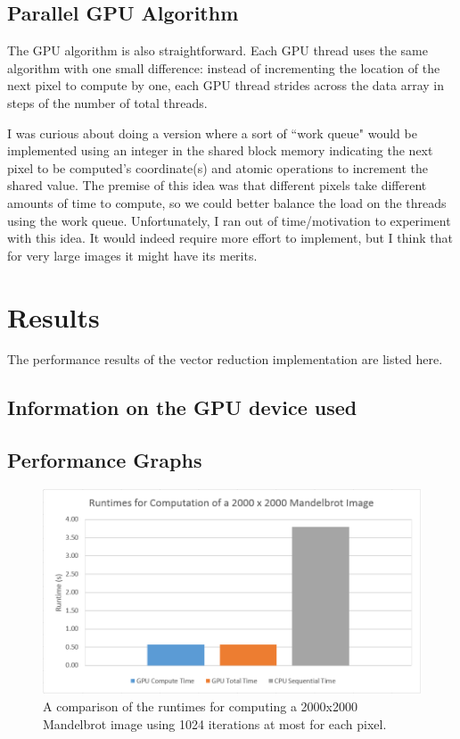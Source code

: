 \documentclass{article}
\begin{document}
\subsection{Parallel GPU Algorithm}
The GPU algorithm is also straightforward. Each GPU thread uses the same algorithm with one small difference: instead of incrementing the location of the next pixel to compute by one, each GPU thread strides across the data array in steps of the number of total threads.

I was curious about doing a version where a sort of ``work queue" would be implemented using an integer in the shared block memory indicating the next pixel to be computed's coordinate(s) and atomic operations to increment the shared value. The premise of this idea was that different pixels take different amounts of time to compute, so we could better balance the load on the threads using the work queue. Unfortunately, I ran out of time/motivation to experiment with this idea. It would indeed require more effort to implement, but I think that for very large images it might have its merits.

\newpage
\section{Results}
The performance results of the vector reduction implementation are listed here.

\subsection{Information on the GPU device used}

\newpage
\subsection{Performance Graphs}
  \begin{figure}[h!]
    \centering
    \includegraphics[width=.9\linewidth]{runtime}
    \caption{A comparison of the runtimes for computing a 2000x2000 Mandelbrot image using 1024 iterations at most for each pixel.}
    \label{fig:runtime}
  \end{figure}
\end{document}
